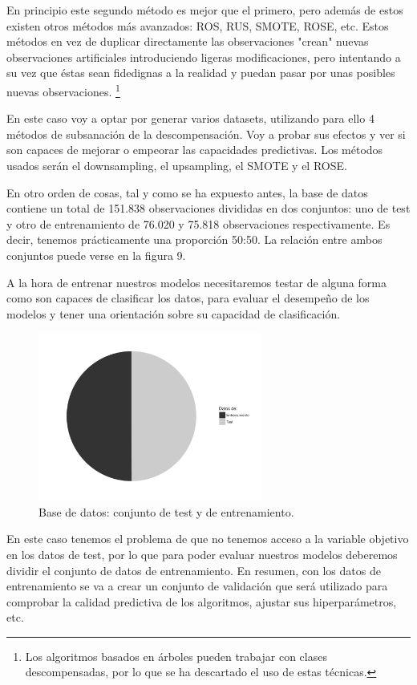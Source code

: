 \documentclass[11pt,a4paper,spanish]{article} %
\begin{document}
En principio este segundo método es mejor que el primero, pero además de estos existen otros métodos más avanzados: ROS, RUS, SMOTE, ROSE, etc. Estos métodos en vez de duplicar directamente las observaciones "crean" nuevas observaciones artificiales introduciendo ligeras modificaciones, pero intentando a su vez que éstas sean fidedignas a la realidad y puedan pasar por unas posibles nuevas observaciones. \footnote{Los algoritmos basados en árboles pueden trabajar con clases descompensadas, por lo que se ha descartado el uso de estas técnicas.}

En este caso voy a optar por generar varios datasets, utilizando para ello 4 métodos de subsanación de la descompensación. Voy a probar sus efectos y ver si son capaces de mejorar o empeorar las capacidades predictivas. Los métodos usados serán el downsampling, el upsampling, el SMOTE y el ROSE. 

En otro orden de cosas, tal y como se ha expuesto antes, la base de datos contiene un total de 151.838 observaciones divididas en dos conjuntos: uno de test y otro de entrenamiento de 76.020 y 75.818 observaciones respectivamente. Es decir, tenemos prácticamente una proporción 50:50. La relación entre ambos conjuntos puede verse en la figura 9.


A la hora de entrenar nuestros modelos necesitaremos testar de alguna forma como son capaces de clasificar los datos, para evaluar el desempeño de los modelos y tener una orientación sobre su capacidad de clasificación.

\begin{figure}[h!]
	\begin{center}
	\includegraphics[width=2.9in]{Z_01_09_Datos_test_entrenamiento.pdf}
    \caption{Base de datos: conjunto de test y de entrenamiento.}
    \end{center}
\end{figure}

En este caso tenemos el problema de que no tenemos acceso a la variable objetivo en los datos de test, por lo que para poder evaluar nuestros modelos deberemos dividir el conjunto de datos de entrenamiento. En resumen, con los datos de entrenamiento se va a crear un conjunto de validación que será utilizado para comprobar la calidad predictiva de los algoritmos, ajustar sus hiperparámetros, etc. 
\end{document}
